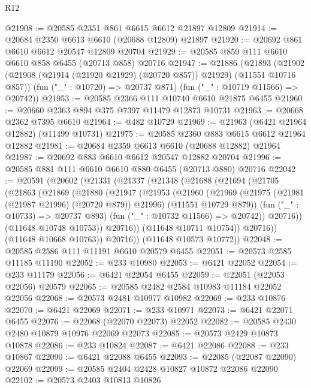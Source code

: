\begin{lexlean}{R12}
\begin{coremodule}
@21908 := @20585 @2351 @861 @6615 @6612 @21897 @12809
@21914 := @20684 @2350 @6613 @6610 (@20688 @12809) @21897
@21920 := @20692 @861 @6610 @6612 @20547 @12809 @20704
@21929 := @20585 @859 @111 @6610 @6610 @858 @6455 (@20713 @858) @20716
@21947 := @21886
    (@21893
      (@21902 (@21908 (@21914 (@21920 @21929) (@20720 @857)) @21929) (@11551 @10716 @857))
      (fun ("_" : @10720) => @20737 @871)
      (fun ("_" : @10719 @11566) => @20742))
@21953 := @20585 @2366 @111 @10740 @6610 @21875 @6455
@21960 := @20660 @2363 @894 @375 @7397 @11479 @12873 @10731
@21963 := @20668 @2362 @7395 @6610
@21964 := @482 @10729
@21969 := @21963 (@6421 @21964 @12882) (@11499 @10731)
@21975 := @20585 @2360 @883 @6615 @6612 @21964 @12882
@21981 := @20684 @2359 @6613 @6610 (@20688 @12882) @21964
@21987 := @20692 @883 @6610 @6612 @20547 @12882 @20704
@21996 := @20585 @881 @111 @6610 @6610 @880 @6455 (@20713 @880) @20716
@22042 := @20591
    (@20602
      (@21331
        (@21337
          (@21348
            (@21688
              (@21694
                (@21705
                  (@21863
                    (@21869
                      (@21880
                        (@21947
                          (@21953
                            (@21960
                              (@21969
                                (@21975 (@21981 (@21987 @21996) (@20720 @879)) @21996)
                                (@11551 @10729 @879))
                              (fun ("_" : @10733) => @20737 @893)
                              (fun ("_" : @10732 @11566) => @20742))
                            @20716))
                        (@11648 @10748 @10753))
                      @20716))
                  (@11648 @10711 @10754))
                @20716))
            (@11648 @10668 @10763))
          @20716))
      (@11648 @10573 @10772))
@22048 := @20585 @2586 @111 @11191 @6610 @20579 @6455
@22051 := @20573 @2585 @11185 @11190
@22052 := @233 @10980
@22053 := @6421 @22052
@22054 := @233 @11179
@22056 := @6421 @22054 @6455
@22059 := @22051 (@22053 @22056) @20579
@22065 := @20585 @2482 @2584 @10983 @11184 @22052 @22056
@22068 := @20573 @2481 @10977 @10982
@22069 := @233 @10876
@22070 := @6421 @22069
@22071 := @233 @10971
@22073 := @6421 @22071 @6455
@22076 := @22068 (@22070 @22073) @22052
@22082 := @20585 @2430 @2480 @10879 @10976 @22069 @22073
@22085 := @20573 @2429 @10873 @10878
@22086 := @233 @10824
@22087 := @6421 @22086
@22088 := @233 @10867
@22090 := @6421 @22088 @6455
@22093 := @22085 (@22087 @22090) @22069
@22099 := @20585 @2404 @2428 @10827 @10872 @22086 @22090
@22102 := @20573 @2403 @10813 @10826

\end{coremodule}
\end{lexlean}
